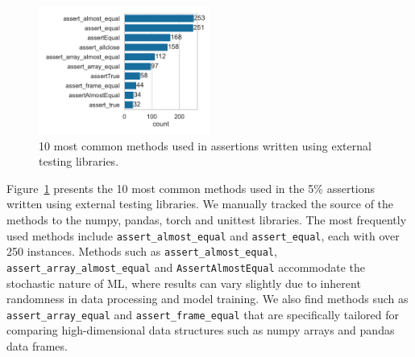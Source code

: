 \begin{figure}
  \centering
  \includegraphics[width=0.5\textwidth]{other-test-methods.pdf}
  \caption{10 most common methods used in assertions written using external testing libraries.}
  \label{fig:other-test-methods}
\end{figure}

Figure~\ref{fig:other-test-methods} presents the 10 most common methods used in the 5\% assertions written using external testing libraries. We manually tracked the source of the methods to the numpy, pandas, torch and unittest libraries. The most frequently used methods include \lstinline{assert_almost_equal} and \lstinline{assert_equal}, each with over 250 instances. Methods such as \lstinline{assert_almost_equal}, \lstinline{assert_array_almost_equal} and \lstinline{AssertAlmostEqual} accommodate the stochastic nature of ML, where results can vary slightly due to inherent randomness in data processing and model training. We also find methods such as \lstinline{assert_array_equal} and \lstinline{assert_frame_equal} that are specifically tailored for comparing high-dimensional data structures such as numpy arrays and pandas data frames.

